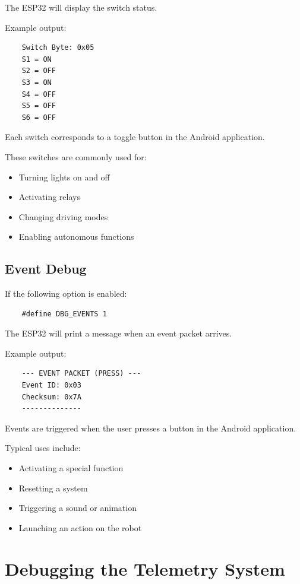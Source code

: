 The ESP32 will display the switch status.

Example output:

\begin{verbatim}
	Switch Byte: 0x05
	S1 = ON
	S2 = OFF
	S3 = ON
	S4 = OFF
	S5 = OFF
	S6 = OFF
\end{verbatim}

Each switch corresponds to a toggle button in the Android application.

These switches are commonly used for:

\begin{itemize}
	\item Turning lights on and off
	\item Activating relays
	\item Changing driving modes
	\item Enabling autonomous functions
\end{itemize}

\subsection{Event Debug}

If the following option is enabled:

\begin{verbatim}
	#define DBG_EVENTS 1
\end{verbatim}

The ESP32 will print a message when an event packet arrives.

Example output:

\begin{verbatim}
	--- EVENT PACKET (PRESS) ---
	Event ID: 0x03
	Checksum: 0x7A
	--------------

\end{verbatim}

Events are triggered when the user presses a button in the Android application.

Typical uses include:

\begin{itemize}
	\item Activating a special function
	\item Resetting a system
	\item Triggering a sound or animation
	\item Launching an action on the robot
\end{itemize}

\section{Debugging the Telemetry System}

